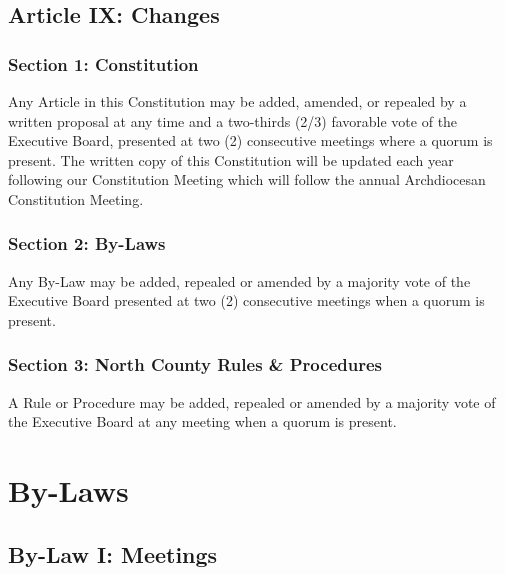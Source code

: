 \documentclass[draft]{memoir}
\begin{document}
\section{Article IX: Changes}
\subsection{Section 1: Constitution}
Any Article in this Constitution may be added, amended, or repealed by a written proposal at any time and a two-thirds (2/3) favorable vote of the Executive Board, presented at two (2) consecutive meetings where a quorum is present.  The written copy of this Constitution will be updated each year following our Constitution Meeting which will follow the annual Archdiocesan Constitution Meeting.  

\subsection{Section 2: By-Laws}
Any By-Law may be added, repealed or amended by a majority vote of the Executive Board presented at two (2) consecutive meetings when a quorum is present.

\subsection{Section 3: North County Rules \& Procedures}
A Rule or Procedure may be added, repealed or amended by a majority vote of the Executive Board at any meeting when a quorum is present.

\chapter{By-Laws}
\section{By-Law I: Meetings}
\end{document}
